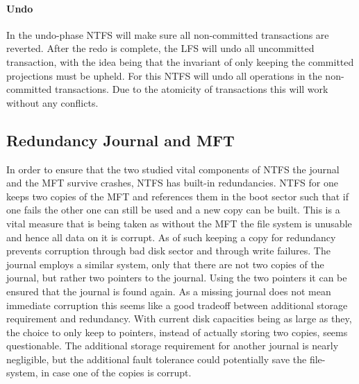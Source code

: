 \paragraph{Undo}
In the undo-phase NTFS will make sure all non-committed transactions are reverted.
After the redo is complete, the LFS will undo all uncommitted transaction, with the idea being that the invariant of only keeping the committed projections must be upheld. For this NTFS will undo all operations in the non-committed transactions. Due to the atomicity of transactions this will work without any conflicts.
\subsection{Redundancy Journal and MFT}
In order to ensure that the two studied vital components of NTFS the journal and the MFT survive crashes, NTFS has built-in redundancies. NTFS for one keeps two copies of the MFT and references them in the boot sector such that if one fails the other one can still be used and a new copy can be built. This is a vital measure that is being taken  as without the MFT the file system is unusable and hence all data on it is corrupt. As of such keeping a copy for redundancy prevents corruption through bad disk sector and through write failures. The journal employs a similar system, only  that there are not two copies of the journal, but rather two pointers to the journal. Using the two pointers it can be ensured that the journal is found again\cite{RUSSINOVICH_ET_AL:2012:WI}. As a missing journal does not mean immediate corruption this seems like a good tradeoff between additional storage requirement and redundancy.
With current disk capacities being as large as they, the choice to only keep to pointers, instead of actually storing two copies, seems questionable. The additional storage requirement for another journal is nearly negligible, but the additional fault tolerance could potentially save the file-system, in case one of the copies is corrupt.
